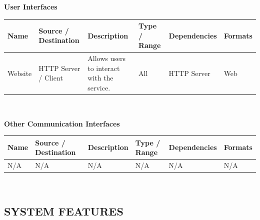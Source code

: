 \documentclass[12pt]{report}
\begin{document}
   {\centering \textbf{User Interfaces} \\[0.1cm]
   \begin{tabular}{| p{2cm} | p{2cm} | p{5cm} | p{2cm} | p{2.8cm} | p{1.6cm} |}
    \hline
     \textbf{Name} & \textbf{Source / Destination} & \textbf{Description} & \textbf{Type / Range} & \textbf{Dependencies} & \textbf{Formats} \\ \hline
     Website & HTTP Server / Client & Allows users to interact with the service. & All & HTTP Server & Web \\ \hline
   \end{tabular}\\[0.1cm]}
   {\centering \textbf{Other Communication Interfaces} \\[0.1cm]
   \begin{tabular}{| p{2cm} | p{2cm} | p{5cm} | p{2cm} | p{2.8cm} | p{1.6cm} |}
    \hline
     \textbf{Name} & \textbf{Source / Destination} & \textbf{Description} & \textbf{Type / Range} & \textbf{Dependencies} & \textbf{Formats} \\ \hline
     N/A & N/A & N/A & N/A & N/A & N/A \\ \hline
   \end{tabular}\\[0.1cm]}
 \subsection{SYSTEM FEATURES}
\end{document}
